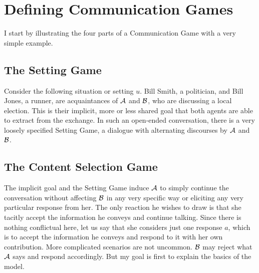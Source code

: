 \chapter{Defining Communication Games} \label{ch:defining communication games}

%
%
%
%       
%
%
%
%
%



\noindent I start by illustrating the four parts of a Communication Game with a very simple example.

\section{The Setting Game} \label{sec:setting game}

Consider the following situation or setting $u$. Bill Smith, a politician, and Bill Jones, a runner, are acquaintances of $\cal A$ and $\cal B$, who are discussing a local election. This is their implicit, more or less shared goal that both agents are able to extract from the exchange. In such an open-ended conversation, there is a very loosely specified Setting Game, a dialogue with alternating discourses by $\cal A$ and $\cal B$.

\section{The Content Selection Game} \label{sec:content selection game}

The implicit goal and the Setting Game induce $\cal A$ to simply continue the conversation without affecting $\cal B$ in any very specific way or eliciting any very particular response from her. The only reaction he wishes to draw is that she tacitly accept the information he conveys and continue talking. Since there is nothing conflictual here, let us say that she considers just one response $a$, which is to accept the information he conveys and respond to it with her own contribution. More complicated scenarios are not uncommon. $\cal B$ may reject what $\cal A$ says and respond accordingly. But my goal is first to explain the basics of the model.

